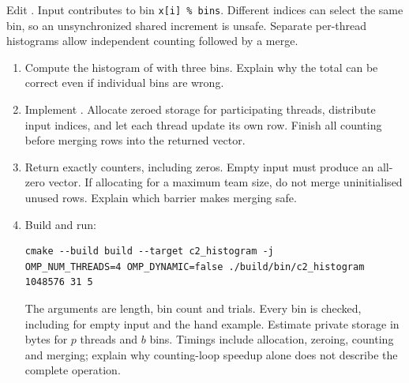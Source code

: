 Edit . Input  contributes to bin
\lstinline|x[i] % bins|. Different indices can select the same bin, so an
unsynchronized shared increment is unsafe. Separate per-thread histograms allow
independent counting followed by a merge.
\begin{enumerate}
\item Compute the histogram of  with three bins.
Explain why the total can be correct even if individual bins are wrong.
\item Implement . Allocate zeroed storage for participating
threads, distribute input indices, and let each thread update its own row.
Finish all counting before merging rows into the returned vector.
\item Return exactly  counters, including zeros. Empty input must
produce an all-zero vector. If allocating for a maximum team size, do not merge
uninitialised unused rows. Explain which barrier makes merging safe.
\item Build and run:
\begin{lstlisting}[style=shell]
cmake --build build --target c2_histogram -j
OMP_NUM_THREADS=4 OMP_DYNAMIC=false ./build/bin/c2_histogram 1048576 31 5
\end{lstlisting}
The arguments are length, bin count and trials. Every bin is checked, including
for empty input and the hand example. Estimate private storage in bytes for
$p$ threads and $b$ bins. Timings include allocation, zeroing, counting and merging;
explain why counting-loop speedup alone does not describe the complete operation.
\end{enumerate}

